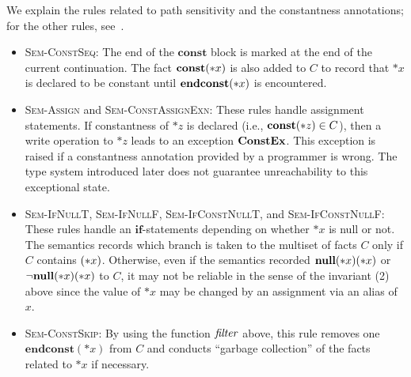 We explain the rules related to path sensitivity and the
constantness annotations; for the other rules, see~\cite{}.
\begin{itemize}
\item \textsc{Sem-ConstSeq}: The end of the $\mathbf{const}$ block is
      marked at the end of the current continuation.  The fact
      $\mathbf{const}(*x)$ is also added to $C$ to record that $*x$ is declared
      to be constant until $\mathbf{endconst}(*x)$ is encountered.
\item \textsc{Sem-Assign} and \textsc{Sem-ConstAssignExn}: These rules
      handle assignment statements.  If constantness of $*z$ is declared
      (i.e., $\mathbf{const}(*z) \in C$), then a write operation to $*z$ leads
      to an exception $\mathbf{ConstEx}$.  This exception is raised if a
      constantness annotation provided by a programmer is wrong.  The
      type system introduced later does not guarantee unreachability to
      this exceptional state.
\item \textsc{Sem-IfNullT}, \textsc{Sem-IfNullF},
      \textsc{Sem-IfConstNullT}, and \textsc{Sem-IfConstNullF}: These
      rules handle an $\mathbf{if}$-statements depending on whether $*x$
      is null or not.  The semantics records which branch is taken to
      the multiset of facts $C$ only if $C$ contains $(*x)$.
      Otherwise, even if the semantics recorded $\mathbf{null}(*x)(*x)$ or
      $\neg\mathbf{null}(*x)(*x)$ to $C$, it may not be reliable in the sense of the
      invariant (2) above since the value of $*x$ may be changed by an
      assignment via an alias of $x$.
\item \textsc{Sem-ConstSkip}: By using the function $\mathit{filter}$ above,
      this rule removes one $\mathbf{endconst}(*x)$ from $C$ and
      conducts ``garbage collection'' of the facts related to $*x$ if
      necessary.


\end{itemize}
